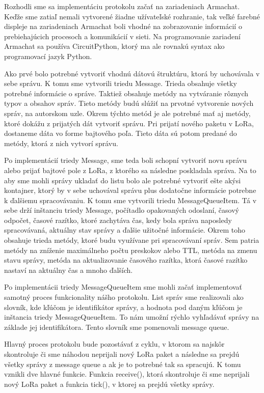 \documentclass[slovak,master]{diploma}
\begin{document}
Rozhodli sme sa implementáciu protokolu začať na zariadeniach Armachat. Keďže sme zatiaľ nemali vytvorené žiadne užívateľské rozhranie, tak veľké farebné displeje na zariadeniach Armachat 
boli vhodné na zobrazovanie informácií o prebiehajúcich procesoch a komunikácií v sieti. Na programovanie zariadení Armachat sa používa CircuitPython, ktorý ma ale rovnakú syntax ako 
programovací jazyk Python.

Ako prvé bolo potrebné vytvoriť vhodnú dátovú štruktúru, ktorá by uchovávala v sebe správu. K tomu sme vytvorili triedu Message. Trieda obsahuje všetky potrebné informácie o správe. 
Taktiež obsahuje metódy na vytváranie rôznych typov a obsahov správ. Tieto metódy budú slúžiť na prvotné vytvorenie nových správ, na autorskom uzle. Okrem týchto metód je 
ale potrebné mať aj metódy, ktoré dokážu z prijatých dát vytvoriť správu. Pri prijatí nového paketu v LoRa, dostaneme dáta vo forme bajtového poľa. Tieto dáta sú potom predané 
do metódy, ktorá z nich vytvorí správu.

Po implementácií triedy Message, sme teda boli schopní vytvoriť novu správu alebo prijať bajtové pole z LoRa, z ktorého sa následne poskladala správa. Na to aby sme 
mohli správy ukladať do listu bolo ale potrebné vytvoriť ešte akýsi kontajner, ktorý by v sebe uchovával správu plus dodatočne informácie potrebne k ďalšiemu spracovávaniu.
K tomu sme vytvorili triedu MessageQueueItem. Tá v sebe drží inštanciu triedy Message, počítadlo opakovaných odoslaní, časový odpočet, časové razítko, ktoré zachytáva čas, kedy bola 
správa naposledy spracovávaná, aktuálny stav správy a ďalšie užitočné informácie. Okrem toho obsahuje trieda metódy, ktoré budu využívane pri spracovávaní správ. Sem patria metódy na zníženie maximálneho počtu preskokov alebo 
TTL, metóda na zmenu stavu správy, metóda na aktualizovanie časového razítka, ktorá časové razítko nastaví na aktuálny čas a mnoho ďalších.

Po implementácii triedy MessageQueueItem sme mohli začať implementovať samotný proces funkcionality nášho protokolu. List správ sme realizovali ako slovník, 
kde kľúčom je identifikátor správy, a hodnota pod daným kľúčom je inštancia triedy MessageQueueItem. To nám umožní rýchlo vyhľadávať správy na základe jej identifikátora. 
Tento slovník sme pomenovali message queue.

Hlavný proces protokolu bude pozostávať z cyklu, v ktorom sa najskôr skontroluje či sme náhodou neprijali nový LoRa paket a následne sa prejdú všetky správy z message queue a ak je to 
potrebné tak sa spracujú. K tomu vznikli dve hlavné funkcie. Funkcia receive(), ktorá skontroluje či sme neprijali nový LoRa paket a funkcia tick(), v ktorej sa prejdú všetky správy.
\end{document}
